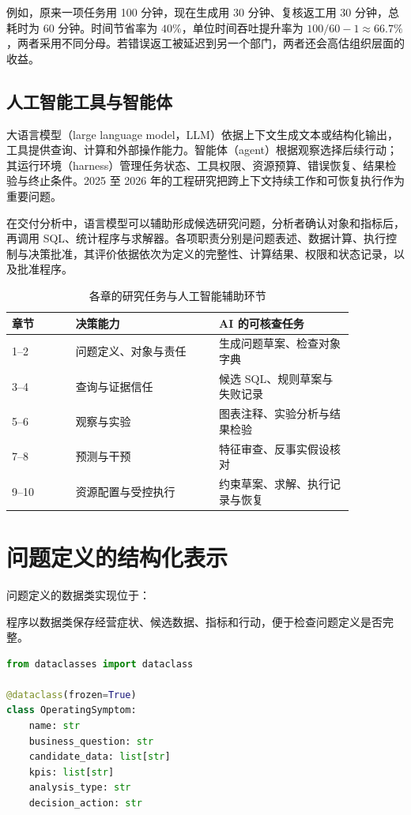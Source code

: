 例如，原来一项任务用 100 分钟，现在生成用 30 分钟、复核返工用 30 分钟，总耗时为 60 分钟。时间节省率为 \(40\%\)，单位时间吞吐提升率为 \(100/60-1\approx66.7\%\)，两者采用不同分母。若错误返工被延迟到另一个部门，两者还会高估组织层面的收益。

\subsection{人工智能工具与智能体}
大语言模型（large language model，LLM）依据上下文生成文本或结构化输出，工具提供查询、计算和外部操作能力。智能体（agent）根据观察选择后续行动；其运行环境（harness）管理任务状态、工具权限、资源预算、错误恢复、结果检验与终止条件。2025 至 2026 年的工程研究把跨上下文持续工作和可恢复执行作为重要问题\cite{harness01}。

在交付分析中，语言模型可以辅助形成候选研究问题，分析者确认对象和指标后，再调用 SQL、统计程序与求解器。各项职责分别是问题表述、数据计算、执行控制与决策批准，其评价依据依次为定义的完整性、计算结果、权限和状态记录，以及批准程序。

\begin{table}[htbp]
\centering\small
\caption{各章的研究任务与人工智能辅助环节}
\begin{tabular}{P{0.16\linewidth}P{0.36\linewidth}P{0.34\linewidth}}
\toprule
{}
章节 & 决策能力 & AI 的可核查任务\\
--2 & 问题定义、对象与责任 & 生成问题草案、检查对象字典\\
3--4 & 查询与证据信任 & 候选 SQL、规则草案与失败记录\\
5--6 & 观察与实验 & 图表注释、实验分析与结果检验\\
7--8 & 预测与干预 & 特征审查、反事实假设核对\\
9--10 & 资源配置与受控执行 & 约束草案、求解、执行记录与恢复\\
\bottomrule
\end{tabular}
\end{table}

\section{问题定义的结构化表示}

问题定义的数据类实现位于：
\begin{center}
\end{center}

程序以数据类保存经营症状、候选数据、指标和行动，便于检查问题定义是否完整。
\begin{lstlisting}[language=Python,caption={经营症状的数据结构}]
from dataclasses import dataclass

@dataclass(frozen=True)
class OperatingSymptom:
    name: str
    business_question: str
    candidate_data: list[str]
    kpis: list[str]
    analysis_type: str
    decision_action: str
\end{lstlisting}

